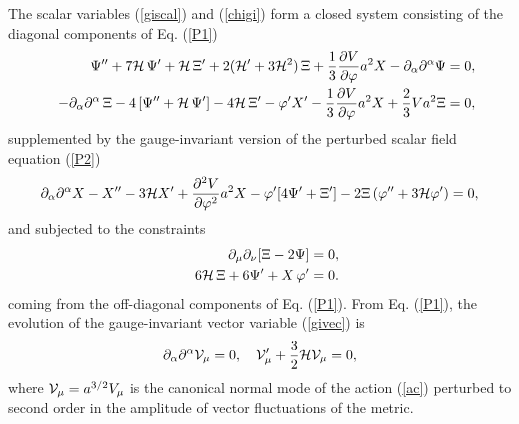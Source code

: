 \documentclass[a4paper,12pt]{article}
\begin{document}
The scalar variables (\ref{giscal}) and (\ref{chigi}) 
form a closed system consisting of the diagonal components of Eq. (\ref{P1}) 
\begin{eqnarray}
&&\Psi'' + 7 {\cal H} \,\Psi' + {\cal H}\, \Xi' + 
2 ( {\cal H}' + 3 {\cal H}^2)\,\Xi + \frac{1}{3} 
\frac{\partial V}{\partial\varphi} a^2 X - \partial_{\alpha}
\partial^{\alpha} \Psi =0,
\label{ps}\\
&&- \partial_{\alpha}\partial^{\alpha}\,\Xi - 4\, [ \Psi''+ {\cal H}\,\Psi'] - 
4 {\cal H}\, \Xi' - \varphi' X' - \frac{1}{3} 
\frac{\partial V}{\partial\varphi} a^2 X + \frac{2}{3} V a^2 \Xi =0,
\label{xi}\\
\end{eqnarray}
supplemented by the gauge-invariant version of the 
 perturbed scalar field equation (\ref{P2})
\begin{equation}
\partial_{\alpha} \partial^{\alpha} X - X'' - 3 {\cal H} X' + 
\frac{ \partial^2 V}{\partial\varphi^2} a^2 X - 
\varphi' [ 4 \Psi' + \Xi'] - 2 \Xi\,( \varphi'' + 3 {\cal H} \varphi') =0,
\label{ch}
\end{equation}
and subjected to the constraints 
\begin{eqnarray}
&&\partial_{\mu}\partial_{\nu}[ \Xi - 2 \Psi] =0,
\label{con1}\\
&& 6 {\cal H}\, \Xi + 6 \Psi' + X \,\varphi' =0.
\label{con3}
\end{eqnarray}
coming from the off-diagonal components of Eq. (\ref{P1}).
From Eq. (\ref{P1}), the 
 evolution of the gauge-invariant vector variable (\ref{givec}) is 
\begin{equation}
\partial_{\alpha} \partial^{\alpha} {\cal V}_{\mu} =0,\,\,\,\,\,\,
{\cal V}_{\mu}' + 
\frac{3}{2} {\cal H} {\cal V}_{\mu}=0,
\label{calV}
\end{equation}
where ${\cal V}_{\mu} = a^{3/2} V_{\mu}$ is the canonical 
normal mode of the action (\ref{ac}) perturbed to second order in the 
amplitude of vector fluctuations of the metric. 
\end{document}
